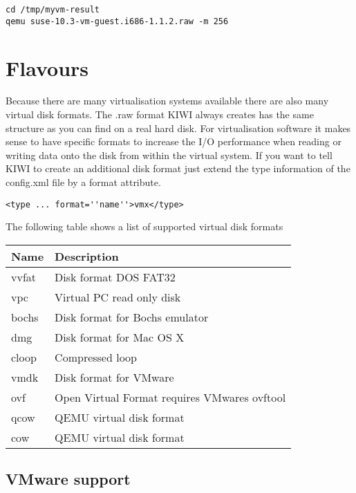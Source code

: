 \begin{Command}{12cm}
\begin{verbatim}
cd /tmp/myvm-result
qemu suse-10.3-vm-guest.i686-1.1.2.raw -m 256
\end{verbatim}
\end{Command}

\section{Flavours}

Because there are many virtualisation systems available there are also
many virtual disk formats. The .raw format KIWI always creates has the
same structure as you can find on a real hard disk. For virtualisation
software it makes sense to have specific formats to increase the
I/O performance when reading or writing data onto the disk from within
the virtual system. If you want to tell KIWI to create an additional
disk format just extend the type information of the config.xml file
by a format attribute.

\begin{Command}{12cm}
\begin{verbatim}
<type ... format=''name''>vmx</type>
\end{verbatim}
\end{Command}

The following table shows a list of supported virtual disk formats

\begin{tabular}[h]{|p{2cm}|p{9cm}|}
\hline
\textbf{Name} & \textbf{Description} \\
\hline
vvfat       & Disk format DOS FAT32 \\
vpc         & Virtual PC read only disk  \\
bochs       & Disk format for Bochs emulator  \\
dmg         & Disk format for Mac OS X \\
cloop       & Compressed loop \\
vmdk        & Disk format for VMware \\
ovf         & Open Virtual Format requires VMwares ovftool \\
qcow        & QEMU virtual disk format  \\
cow         & QEMU virtual disk format  \\
\hline
\end{tabular}

\subsection{VMware support}

